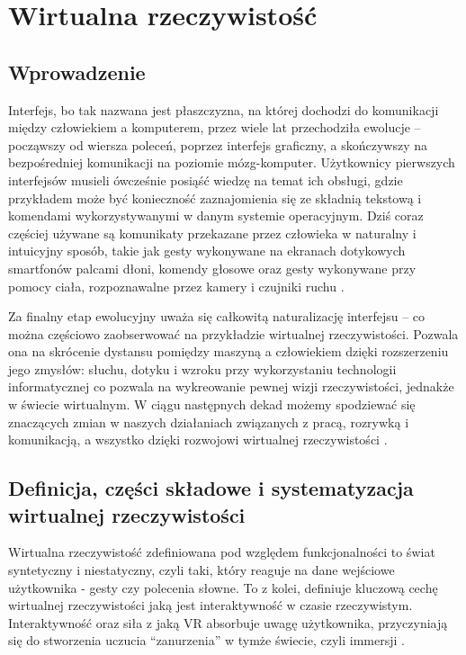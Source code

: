 \chapter{Wirtualna rzeczywistość}
\label{chap:pierwszy}



\section{Wprowadzenie}

Interfejs, bo tak nazwana jest płaszczyzna, na której dochodzi do komunikacji między człowiekiem a komputerem, przez wiele lat przechodziła ewolucje – począwszy od wiersza poleceń, poprzez interfejs graficzny, a skończywszy na bezpośredniej komunikacji na poziomie mózg-komputer. Użytkownicy pierwszych interfejsów musieli ówcześnie posiąść wiedzę na temat ich obsługi, gdzie przykładem może być konieczność zaznajomienia się ze składnią tekstową i komendami wykorzystywanymi w danym systemie operacyjnym. Dziś coraz częściej używane są komunikaty przekazane przez człowieka w naturalny i intuicyjny sposób, takie jak gesty wykonywane na ekranach dotykowych smartfonów palcami dłoni, komendy głosowe oraz gesty wykonywane przy pomocy ciała, rozpoznawalne przez kamery i czujniki ruchu  \citep{virtualtech, virtualspeech}.

Za finalny etap ewolucyjny  uważa się całkowitą naturalizację interfejsu – co można częściowo zaobserwować na przykładzie wirtualnej rzeczywistości. Pozwala ona na skrócenie dystansu pomiędzy maszyną a człowiekiem dzięki rozszerzeniu jego zmysłów: słuchu, dotyku i wzroku przy wykorzystaniu technologii informatycznej co pozwala na wykreowanie pewnej wizji rzeczywistości, jednakże w świecie wirtualnym. W ciągu następnych dekad możemy spodziewać się znaczących zmian w naszych działaniach związanych z pracą, rozrywką i komunikacją, a wszystko dzięki rozwojowi wirtualnej rzeczywistości \citep{virtualspeech}.



\section{Definicja, części składowe i systematyzacja wirtualnej rzeczywistości}

Wirtualna rzeczywistość zdefiniowana pod względem funkcjonalności to świat syntetyczny i niestatyczny, czyli taki, który reaguje na dane wejściowe użytkownika - gesty czy polecenia słowne. To z kolei, definiuje kluczową cechę wirtualnej rzeczywistości jaką jest interaktywność w czasie rzeczywistym. Interaktywność oraz siła z jaką VR absorbuje uwagę użytkownika, przyczyniają się do stworzenia uczucia ``zanurzenia'' w tymże świecie, czyli immersji \citep{virtualtech}.

